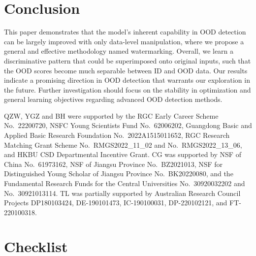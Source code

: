 \documentclass{article}
\begin{document}
\section{Conclusion}

This paper demonstrates that the model's inherent capability in OOD detection can be largely improved with only data-level manipulation, where we propose a general and effective methodology named watermarking. Overall, we learn a discriminative pattern that could be superimposed onto original inputs, such that the OOD scores become much separable between ID and OOD data. Our results indicate a promising direction in OOD detection that warrants our exploration in the future. Further investigation should focus on the stability in optimization and general learning objectives regarding advanced OOD detection methods. 


\begin{ack}
QZW, YGZ and BH were supported by the RGC Early Career Scheme No.~22200720, NSFC Young Scientists Fund No.~62006202, Guangdong Basic and Applied Basic Research Foundation No.~2022A1515011652, RGC Research Matching Grant Scheme No.~RMGS2022\_11\_02 and No.~RMGS2022\_13\_06, and HKBU CSD Departmental Incentive Grant. CG was supported by NSF of China No.~61973162, NSF of Jiangsu Province No.~BZ2021013, NSF for Distinguished Young Scholar of Jiangsu Province No.~BK20220080, and the Fundamental Research Funds for the Central Universities No.~30920032202 and No.~30921013114. TL was partially supported by Australian Research Council Projects DP180103424, DE-190101473, IC-190100031, DP-220102121, and FT-220100318.
\end{ack}








\section*{Checklist}
\end{document}
